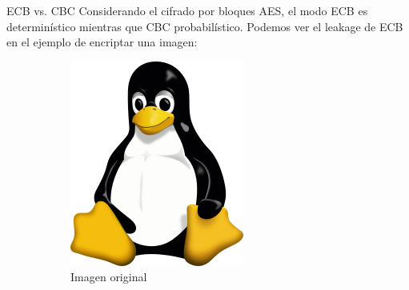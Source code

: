 \begin{frame}{ECB vs. CBC}
  Considerando el cifrado por bloques AES, el modo ECB es determinístico mientras que CBC probabilístico.
  Podemos ver el leakage de ECB en el ejemplo de encriptar una imagen:
  \begin{figure}[h!]
    \centering 
    \begin{subfigure}[b]{0.3\textwidth}
      \centering 
      \includegraphics[width=\textwidth]{Tux.png}
      \caption{Imagen original}
    \end{subfigure}
    \hfill
    \begin{subfigure}[b]{0.3\textwidth}
      \centering 

\end{subfigure}
\end{figure}
\end{frame}
